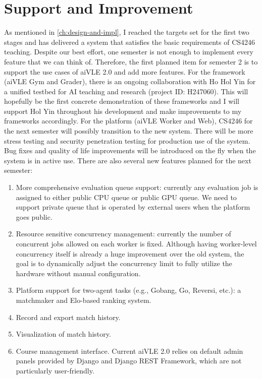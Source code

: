 \documentclass[fyp]{socreport}
\begin{document}
\section{Support and Improvement}
As mentioned in \ref{ch:design-and-impl}, I reached the targets set for the first two stages and has delivered a system that satisfies the basic requirements of CS4246 teaching. Despite our best effort, one semester is not enough to implement every feature that we can think of. Therefore, the first planned item for semester 2 is to support the use cases of aiVLE 2.0 and add more features.
For the framework (aiVLE Gym and Grader), there is an ongoing collaboration with Ho Hol Yin for a unified testbed for AI teaching and research (project ID: H247060). This will hopefully be the first concrete demonstration of these frameworks and I will support Hol Yin throughout his development and make improvements to my frameworks accordingly.
For the platform (aiVLE Worker and Web), CS4246 for the next semester will possibly transition to the new system. There will be more stress testing and security penetration testing for production use of the system. Bug fixes and quality of life improvements will be introduced on the fly when the system is in active use. There are also several new features planned for the next semester:

\begin{enumerate}
    \item More comprehensive evaluation queue support: currently any evaluation job is assigned to either public CPU queue or public GPU queue. We need to support private queue that is operated by external users when the platform goes public.
    \item Resource sensitive concurrency management: currently the number of concurrent jobs allowed on each worker is fixed. Although having worker-level concurrency itself is already a huge improvement over the old system, the goal is to dynamically adjust the concurrency limit to fully utilize the hardware without manual configuration.
    \item Platform support for two-agent tasks (e.g., Gobang, Go, Reversi, etc.): a matchmaker and Elo-based ranking system.
    \item Record and export match history.
    \item Visualization of match history.
    \item Course management interface. Current aiVLE 2.0 relies on default admin panels provided by Django and Django REST Framework, which are not particularly user-friendly.
\end{enumerate}
\end{document}
